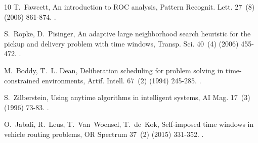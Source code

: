 \documentclass[a4paper,10pt]{article}
\begin{document}
\begin{thebibliography}{10}
T.~Fawcett, An introduction to {ROC} analysis, Pattern Recognit. Lett. 27~(8)
  (2006) 861-874.
\newblock \href {https://doi.org/10.1016/j.patrec.2005.10.010}
  {}.

S.~Ropke, D.~Pisinger, An adaptive large neighborhood search heuristic for the
  pickup and delivery problem with time windows, Transp. Sci. 40~(4) (2006)
  455-472.
\newblock \href {https://doi.org/10.1287/trsc.1050.0135}
  {}.

M.~Boddy, T.~L. Dean, Deliberation scheduling for problem solving in
  time-constrained environments, Artif. Intell. 67~(2) (1994) 245-285.
\newblock \href {https://doi.org/10.1016/0004-3702(94)90054-X}
  {}.

S.~Zilberstein, Using anytime algorithms in intelligent systems, AI Mag. 17~(3)
  (1996) 73-83.
\newblock \href {https://doi.org/10.1609/aimag.v17i3.1232}
  {}.

O.~Jabali, R.~Leus, T.~Van~Woensel, T.~de~Kok, Self-imposed time windows in
  vehicle routing problems, OR Spectrum 37~(2) (2015) 331-352.
\newblock \href {https://doi.org/10.1007/s00291-013-0348-1}
  {}.

\end{thebibliography}
\end{document}
